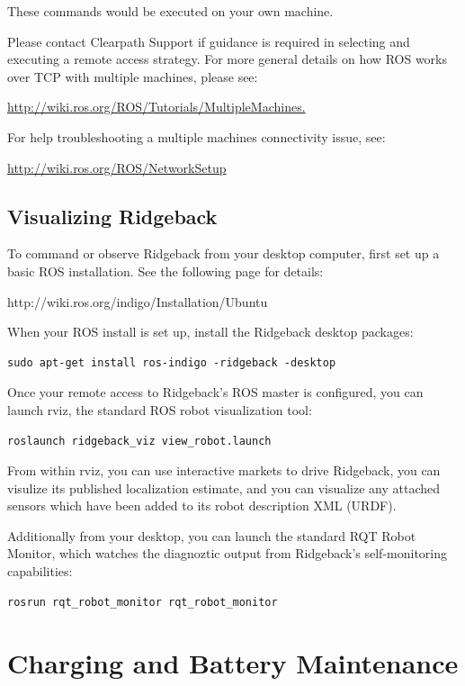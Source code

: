 \documentclass[]{clearpath-latex/clearpath-manual}
\begin{document}
These commands would be executed on your own machine.

Please contact Clearpath Support if guidance is required in selecting and executing a remote access strategy.
For more general details on how ROS works over TCP with multiple machines, please see:

\url{http://wiki.ros.org/ROS/Tutorials/MultipleMachines.}

For help troubleshooting a multiple machines connectivity issue, see:

\url{http://wiki.ros.org/ROS/NetworkSetup}


\subsection{Visualizing Ridgeback}

To command or observe Ridgeback from your desktop computer, first set up a basic ROS installation.  See the following page for details:

http://wiki.ros.org/indigo/Installation/Ubuntu

When your ROS install is set up, install the Ridgeback desktop packages:

\begin{lstlisting}
sudo apt-get install ros-indigo -ridgeback -desktop
\end{lstlisting}

Once your remote access to Ridgeback's ROS master is configured, you can launch rviz, the standard ROS robot visualization tool:

\begin{lstlisting}
roslaunch ridgeback_viz view_robot.launch
\end{lstlisting}

From within rviz, you can use interactive markets to drive Ridgeback, you can visulize its published localization estimate, and you can visualize any attached sensors which have been added to its robot description XML (URDF).

Additionally from your desktop, you can launch the standard RQT Robot Monitor, which watches the diagnoztic output from Ridgeback's self-monitoring capabilities:

\begin{lstlisting}
rosrun rqt_robot_monitor rqt_robot_monitor
\end{lstlisting}

\section{Charging and Battery Maintenance}
\end{document}
